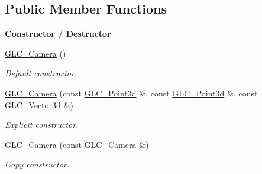 \subsection*{Public Member Functions}
\begin{Indent}{\bf Constructor / Destructor}\par
\begin{DoxyCompactItemize}
\item 
\hyperlink{class_g_l_c___camera_aeb2cd90c0e88d70feded05b07f72afce}{G\-L\-C\-\_\-\-Camera} ()
\begin{DoxyCompactList}\small\item\em Default constructor. \end{DoxyCompactList}\item 
\hyperlink{class_g_l_c___camera_a76cd53c70f42b012e83763a012a13f6b}{G\-L\-C\-\_\-\-Camera} (const \hyperlink{glc__vector3d_8h_a4e13a9bbc7ab3d34de7e98b41836772c}{G\-L\-C\-\_\-\-Point3d} \&, const \hyperlink{glc__vector3d_8h_a4e13a9bbc7ab3d34de7e98b41836772c}{G\-L\-C\-\_\-\-Point3d} \&, const \hyperlink{class_g_l_c___vector3d}{G\-L\-C\-\_\-\-Vector3d} \&)
\begin{DoxyCompactList}\small\item\em Explicit constructor. \end{DoxyCompactList}\item 
\hyperlink{class_g_l_c___camera_ac70ec8572ddec347fc2f74fe68de81ae}{G\-L\-C\-\_\-\-Camera} (const \hyperlink{class_g_l_c___camera}{G\-L\-C\-\_\-\-Camera} \&)
\begin{DoxyCompactList}\small\item\em Copy constructor. \end{DoxyCompactList}\end{DoxyCompactItemize}
\end{Indent}
